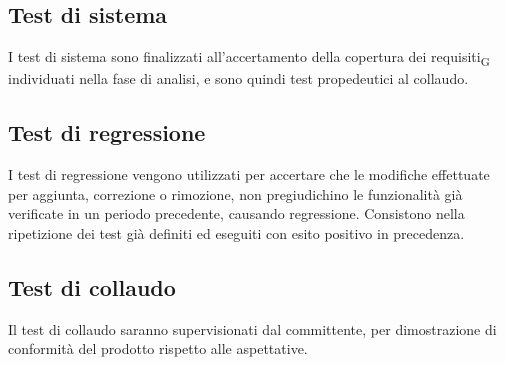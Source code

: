\subsection{Test di sistema}
I test di sistema sono finalizzati all'accertamento della copertura dei requisiti\textsubscript{G} individuati nella fase di analisi, e sono quindi test propedeutici al collaudo.

\subsection{Test di regressione}
I test di regressione vengono utilizzati per accertare che le modifiche effettuate per aggiunta, correzione o rimozione, non pregiudichino le funzionalità già verificate in un periodo precedente, causando regressione. Consistono nella ripetizione dei test già definiti ed eseguiti con esito positivo in precedenza.

\subsection{Test di collaudo}
Il test di collaudo saranno supervisionati dal committente, per dimostrazione di conformità del prodotto rispetto alle aspettative.
